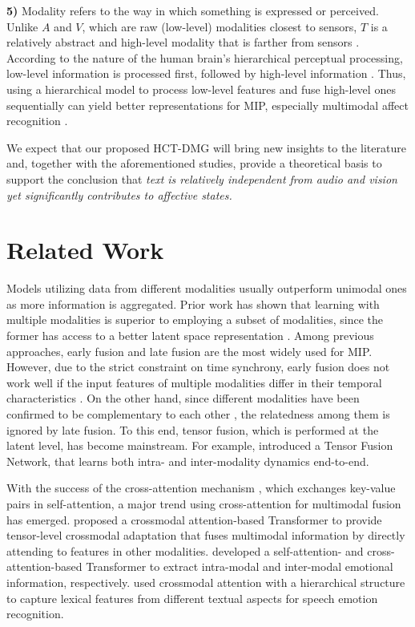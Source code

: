 \documentclass[11pt,a4paper]{article}
\begin{document}
\textbf{5)} Modality refers to the way in which something is expressed or perceived. Unlike $A$ and $V$, which are raw (low-level) modalities closest to sensors, $T$ is a relatively abstract and high-level modality that is farther from sensors \citep{baltruvsaitis2018multimodal}. According to the nature of the human brain's hierarchical perceptual processing, low-level information is processed first, followed by high-level information \citep{peelle2010hierarchical}. Thus, using a hierarchical model to process low-level features and fuse high-level ones sequentially can yield better representations for MIP, especially multimodal affect recognition \citep{tian2016recognizing,Li2022}.

We expect that our proposed HCT-DMG will bring new insights to the literature and, together with the aforementioned studies, provide a theoretical basis to support the conclusion that \textit{text is relatively independent from audio and vision yet significantly contributes to affective states.}

\section{Related Work}
Models utilizing data from different modalities usually outperform unimodal ones as more information is aggregated. Prior work has shown that learning with multiple modalities is superior to employing a subset of modalities, since the former has access to a better latent space representation \citep{huang2021makes}. Among previous approaches, early fusion and late fusion are the most widely used for MIP. However, due to the strict constraint on time synchrony, early fusion does not work well if the input features of multiple modalities differ in their temporal characteristics \citep{Li2020}. On the other hand, since different modalities have been confirmed to be complementary to each other \citep{chuang2004multi}, the relatedness among them is ignored by late fusion. To this end, tensor fusion, which is performed at the latent level, has become mainstream. For example, \citet{zadeh2017} introduced a Tensor Fusion Network, that learns both intra- and inter-modality dynamics end-to-end. 

With the success of the cross-attention mechanism \citep{lu2019vilbert}, which exchanges key-value pairs in self-attention, a major trend using cross-attention for multimodal fusion has emerged. \citet{Tsai2019} proposed a crossmodal attention-based Transformer to provide tensor-level crossmodal adaptation that fuses multimodal information by directly attending to features in other modalities. \citet{Zadeh2019} developed a self-attention- and cross-attention-based Transformer to extract intra-modal and inter-modal emotional information, respectively. \citet{Li2022} used crossmodal attention with a hierarchical structure to capture lexical features from different textual aspects for speech emotion recognition.
\end{document}
